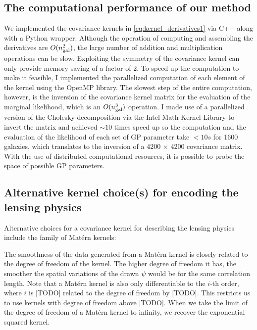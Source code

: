 \subsection{The computational performance of our method}
We implemented the covariance kernels in \ref{eq:kernel_derivatives1}
via {\sc C++} along with a {\sc Python} wrapper. 
Although the operation of computing and assembling the
derivatives are $O(n_{\rm gal}^2)$, the large number of addition and 
multiplication operations can be slow.
Exploiting the symmetry of the covariance kernel can only provide 
memory saving of a factor of 2.
To speed up the computation to make it feasible, 
I implemented the parallelized computation of each element of the kernel using 
the {\sc OpenMP} library. The slowest step of the entire computation, however, 
is the inversion of the
covariance kernel matrix for the evaluation of the marginal likelihood, 
which is an $O(n_{\rm gal}^3)$ operation. 
I made use of a parallelized version of the Cholesky decomposition via the {\sc Intel Math
Kernel Library} to invert the matrix and achieved $\sim10$ 
times speed up so the
computation and the evaluation of the likelihood of each set of GP parameter
take $< 10s$ for 1600 galaxies, which translates to 
the inversion of a 4200 $\times$ 4200 covariance matrix.
With the use of distributed computational resources, it is possible 
to probe the space of possible GP parameters.  


\subsection{Alternative kernel choice(s) for encoding the lensing physics}
Alternative choices for a covariance kernel for describing the lensing physics 
include the family of Mat\'{e}rn kernels:
% 

The smoothness of the data generated from a Mat\'{e}rn kernel is closely
related to the degree of freedom of the kernel. 
The higher degree of freedom it has, the smoother the spatial variations of the
drawn $\psi$ would be for the same correlation length.
Note that a Mat\'{e}rn kernel is also only differentiable to the $i$-th order,
where $i$ is [TODO] related to the degree of freedom by [TODO].
This restricts us to use kernels with degree of freedom above [TODO]. 
When we take the limit of the degree of freedom of a Mat\'{e}rn kernel to infinity, 
we recover the exponential squared kernel.

